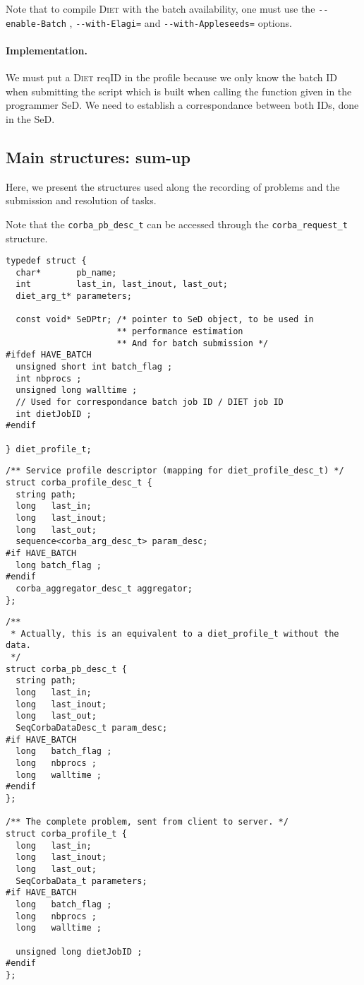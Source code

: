 Note that to compile \textsc{Diet} with the batch availability, one
must use the \verb$--enable-Batch$ , \verb$--with-Elagi=$ and
\verb$--with-Appleseeds=$ options.

\paragraph{Implementation.}$ $\\
We must put a \textsc{Diet} reqID in the profile because we only know
the batch ID when submitting the script which is built when calling
the function given in the programmer SeD. We need to establish a
correspondance between both IDs, done in the SeD.

\subsection{Main structures: sum-up}
Here, we present the structures used along the recording of problems
and the submission and resolution of tasks. 

Note that the \verb$corba_pb_desc_t$ can be accessed through the
\verb$corba_request_t$ structure.

\newpage

\pagestyle{empty}

\begin{minipage}[h]{.3\linewidth}
\begin{verbatim}
typedef struct {
  char*       pb_name;
  int         last_in, last_inout, last_out;
  diet_arg_t* parameters;

  const void* SeDPtr; /* pointer to SeD object, to be used in
                      ** performance estimation
                      ** And for batch submission */
#ifdef HAVE_BATCH
  unsigned short int batch_flag ;
  int nbprocs ;
  unsigned long walltime ;
  // Used for correspondance batch job ID / DIET job ID
  int dietJobID ;
#endif

} diet_profile_t;
\end{verbatim}
\begin{verbatim}
/** Service profile descriptor (mapping for diet_profile_desc_t) */
struct corba_profile_desc_t {
  string path;
  long   last_in;
  long   last_inout;
  long   last_out;
  sequence<corba_arg_desc_t> param_desc;
#if HAVE_BATCH
  long batch_flag ;
#endif
  corba_aggregator_desc_t aggregator;
};
\end{verbatim}
\begin{verbatim}
/**
 * Actually, this is an equivalent to a diet_profile_t without the data.
 */
struct corba_pb_desc_t {
  string path;
  long   last_in;
  long   last_inout;
  long   last_out;
  SeqCorbaDataDesc_t param_desc;
#if HAVE_BATCH
  long   batch_flag ;
  long   nbprocs ;
  long   walltime ;
#endif
};

/** The complete problem, sent from client to server. */
struct corba_profile_t {
  long   last_in;
  long   last_inout;
  long   last_out;
  SeqCorbaData_t parameters;
#if HAVE_BATCH
  long   batch_flag ;
  long   nbprocs ;
  long   walltime ;

  unsigned long dietJobID ;
#endif
};
\end{verbatim}
\end{minipage}


